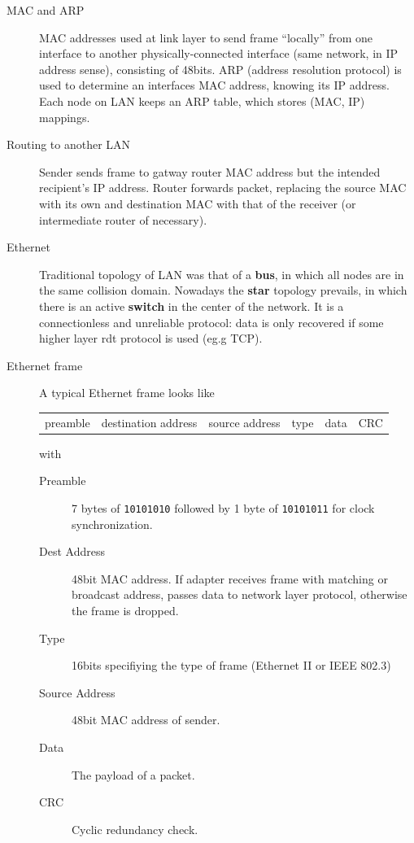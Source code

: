\documentclass{article}
\begin{document}
\begin{description}
    \item[MAC and ARP] MAC addresses used at link layer to send frame ``locally'' from one interface
    to another physically-connected interface (same network, in IP address  sense), consisting of
    48bits. ARP (address resolution protocol) is used to determine an interfaces MAC address, knowing
    its IP address. Each node on LAN keeps an ARP table, which stores (MAC, IP) mappings.
    \item[Routing to another LAN] Sender sends frame to gatway router MAC address but the intended
    recipient's IP address. Router forwards packet, replacing the source MAC with its own and
    destination MAC with that of the receiver (or intermediate router of necessary).
    \item[Ethernet] Traditional topology of LAN was that of a \textbf{bus}, in which all nodes are in 
    the same collision domain. Nowadays the \textbf{star} topology prevails, in which there is an active
    \textbf{switch} in the center of the network. It is a connectionless and unreliable protocol: data
    is only recovered if some higher layer rdt protocol is used (eg.g TCP).
    \item[Ethernet frame] A typical Ethernet frame looks like 
    
    \begin{tabular}[h!]{c|c|c|c|c|c}
    preamble & destination address & source address & type & data & CRC
    \end{tabular}
    
    with
    \begin{description}
        \item[Preamble] 7 bytes of \texttt{10101010} followed by 1 byte of \texttt{10101011} for clock
        synchronization.
        \item[Dest Address] 48bit MAC address. If adapter receives frame with matching or broadcast
        address, passes data to network layer protocol, otherwise the frame is dropped.
        \item[Type] 16bits specifiying the type of frame (Ethernet II or IEEE 802.3)
        \item[Source Address] 48bit MAC address of sender.
        \item[Data] The payload of a packet.
        \item[CRC] Cyclic redundancy check.
    \end{description}
    

\end{description}
\end{document}
